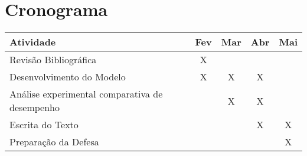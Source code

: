 \section{Cronograma}

\begin{center}
	\begin{tabular}{|l||c||c||c||c|}
		\hline
		Atividade &Fev &Mar &Abr &Mai\\
		\hline
		Revisão Bibliográfica &X & & &\\
		\hline
		Desenvolvimento do Modelo &X &X &X &\\
		\hline
		Análise experimental comparativa de desempenho& &X &X &\\
		\hline
		Escrita do Texto & & &X &X\\
		\hline
		Preparação da Defesa & & & &X\\
		\hline
	\end{tabular}\\
\end{center}